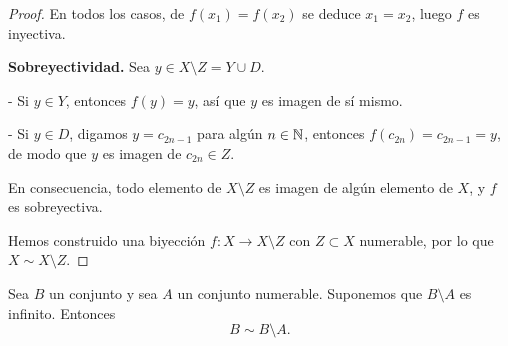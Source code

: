 \begin{proof}
En todos los casos, de $f(x_1) = f(x_2)$ se deduce $x_1 = x_2$, luego
$f$ es inyectiva.

\medskip

\noindent\textbf{Sobreyectividad.}
Sea $y \in X \setminus Z = Y \cup D$.

- Si $y \in Y$, entonces $f(y) = y$, así que $y$ es imagen de sí mismo.

- Si $y \in D$, digamos $y = c_{2n-1}$ para algún $n \in \mathbb{N}$, entonces
  $f(c_{2n}) = c_{2n-1} = y$, de modo que $y$ es imagen de $c_{2n} \in Z$.

En consecuencia, todo elemento de $X \setminus Z$ es imagen de algún
elemento de $X$, y $f$ es sobreyectiva.

\medskip

Hemos construido una biyección $f : X \to X \setminus Z$ con
$Z \subset X$ numerable, por lo que $X \sim X \setminus Z$.
\end{proof}

\begin{prop}
Sea $B$ un conjunto y sea $A$ un conjunto numerable.
Suponemos que $B \setminus A$ es infinito. Entonces
\[
B \sim B \setminus A.
\]
\end{prop}

